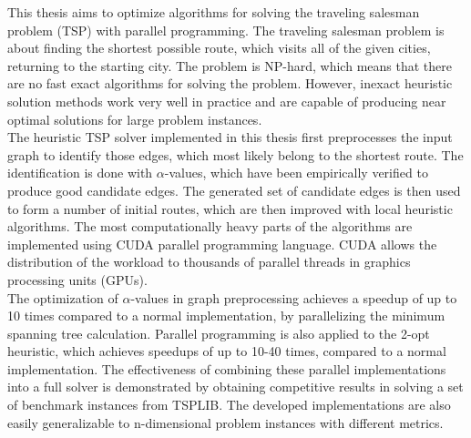 \documentclass[english, 12pt, a4paper, sci, utf8, a-1b, online]{aaltothesis}
\date{6.12.2020}
\begin{document}
\makecoverpage{}

\makecopyrightpage{}

\begin{abstractpage}[english]
This thesis aims to optimize algorithms for solving the traveling salesman problem (TSP) with parallel programming. The traveling salesman problem is about finding the shortest possible route, which visits all of the given cities, returning to the starting city. The problem is NP-hard, which means that there are no fast exact algorithms for solving the problem. However, inexact heuristic solution methods work very well in practice and are capable of producing near optimal solutions for large problem instances. \\

The heuristic TSP solver implemented in this thesis first preprocesses the input graph to identify those edges, which most likely belong to the shortest route. The identification is done with $\alpha$-values, which have been empirically verified to produce good candidate edges. The generated set of candidate edges is then used to form a number of initial routes, which are then improved with local heuristic algorithms. The most computationally heavy parts of the algorithms are implemented using CUDA parallel programming language. CUDA allows the distribution of the workload to thousands of parallel threads in graphics processing units (GPUs). \\

The optimization of $\alpha$-values in graph preprocessing achieves a speedup of up to 10 times compared to a normal implementation, by parallelizing the minimum spanning tree calculation. Parallel programming is also applied to the 2-opt heuristic, which achieves speedups of up to 10-40 times, compared to a normal implementation. The effectiveness of combining these parallel implementations into a full solver is demonstrated by obtaining competitive results in solving a set of benchmark instances from TSPLIB. The developed implementations are also easily generalizable to n-dimensional problem instances with different metrics.
\end{abstractpage}
\end{document}
